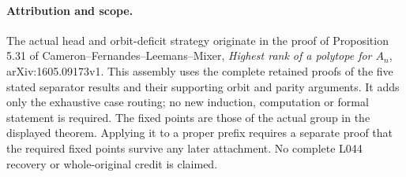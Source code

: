 \documentclass[11pt,a4paper]{article}
\begin{document}
\paragraph{Attribution and scope.}
The actual head and orbit-deficit strategy originate in the proof of
Proposition 5.31 of Cameron--Fernandes--Leemans--Mixer,
\emph{Highest rank of a polytope for $A_n$}, arXiv:1605.09173v1.
This assembly uses the complete retained proofs of the five stated
separator results and their supporting orbit and parity arguments.
It adds only the exhaustive case routing; no new induction,
computation or formal statement is required.
The fixed points are those of the actual group in the displayed
theorem. Applying it to a proper prefix requires a separate proof
that the required fixed points survive any later attachment.
No complete L044 recovery or whole-original credit is claimed.
\end{document}
